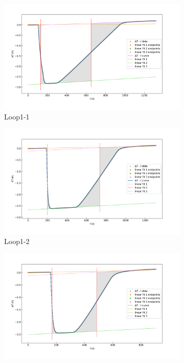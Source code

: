 \documentclass[cn,hazy,pku,12pt,normal,math=newtx,cite=super]{elegantnote}
\begin{document}
\begin{figure}[htbp]
    \centering
    \begin{subfigure}{0.45\textwidth}
        \centering
        \includegraphics[width=\linewidth]{figures/2-1.png}
        \caption*{Loop1-1}
    \end{subfigure}
    \hfill
    \begin{subfigure}{0.45\textwidth}
        \centering
        \includegraphics[width=\linewidth]{figures/2-2.png}
        \caption*{Loop1-2}
    \end{subfigure}
    \vspace{1em} %
    \begin{subfigure}{0.45\textwidth}
        \centering
        \includegraphics[width=\linewidth]{figures/2-3.png}

\end{subfigure}
\end{figure}
\end{document}

